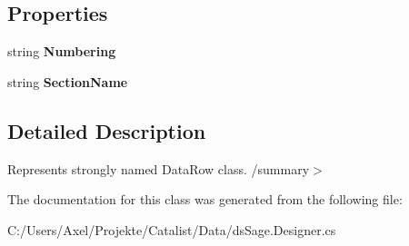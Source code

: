 \subsection*{Properties}
\begin{DoxyCompactItemize}
\item 
string {\bfseries Numbering}\hypertarget{class_products_1_1_data_1_1ds_sage_1_1_catalog_row_a6838c9c7ef36e159e5eee58438d8fe2a}{}\label{class_products_1_1_data_1_1ds_sage_1_1_catalog_row_a6838c9c7ef36e159e5eee58438d8fe2a}

\item 
string {\bfseries Section\+Name}\hypertarget{class_products_1_1_data_1_1ds_sage_1_1_catalog_row_a540b58ca0357c81fdd5feff8dcd422fe}{}\label{class_products_1_1_data_1_1ds_sage_1_1_catalog_row_a540b58ca0357c81fdd5feff8dcd422fe}

\end{DoxyCompactItemize}


\subsection{Detailed Description}
Represents strongly named Data\+Row class. /summary$>$ 

The documentation for this class was generated from the following file\+:\begin{DoxyCompactItemize}
\item 
C\+:/\+Users/\+Axel/\+Projekte/\+Catalist/\+Data/ds\+Sage.\+Designer.\+cs\end{DoxyCompactItemize}
